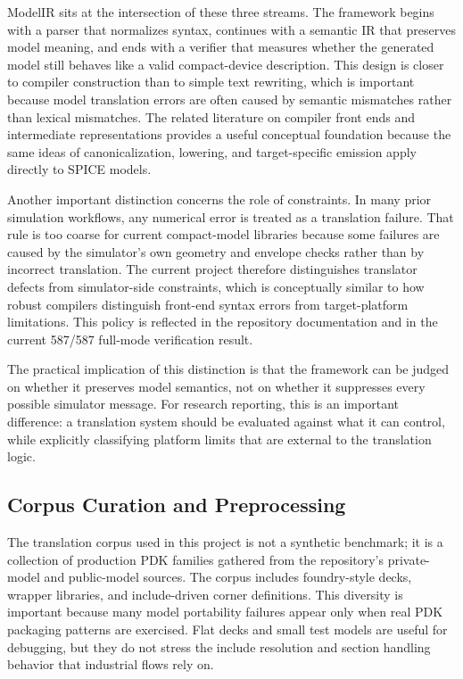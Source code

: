 \documentclass[10pt,twocolumn]{article}
\begin{document}
ModelIR sits at the intersection of these three streams. The framework begins with a parser that normalizes syntax, continues with a semantic IR that preserves model meaning, and ends with a verifier that measures whether the generated model still behaves like a valid compact-device description. This design is closer to compiler construction than to simple text rewriting, which is important because model translation errors are often caused by semantic mismatches rather than lexical mismatches. The related literature on compiler front ends and intermediate representations provides a useful conceptual foundation because the same ideas of canonicalization, lowering, and target-specific emission apply directly to SPICE models.

Another important distinction concerns the role of constraints. In many prior simulation workflows, any numerical error is treated as a translation failure. That rule is too coarse for current compact-model libraries because some failures are caused by the simulator's own geometry and envelope checks rather than by incorrect translation. The current project therefore distinguishes translator defects from simulator-side constraints, which is conceptually similar to how robust compilers distinguish front-end syntax errors from target-platform limitations. This policy is reflected in the repository documentation and in the current 587/587 full-mode verification result.

The practical implication of this distinction is that the framework can be judged on whether it preserves model semantics, not on whether it suppresses every possible simulator message. For research reporting, this is an important difference: a translation system should be evaluated against what it can control, while explicitly classifying platform limits that are external to the translation logic.

\subsection{Corpus Curation and Preprocessing}

The translation corpus used in this project is not a synthetic benchmark; it is a collection of production PDK families gathered from the repository's private-model and public-model sources. The corpus includes foundry-style decks, wrapper libraries, and include-driven corner definitions. This diversity is important because many model portability failures appear only when real PDK packaging patterns are exercised. Flat decks and small test models are useful for debugging, but they do not stress the include resolution and section handling behavior that industrial flows rely on.
\end{document}
